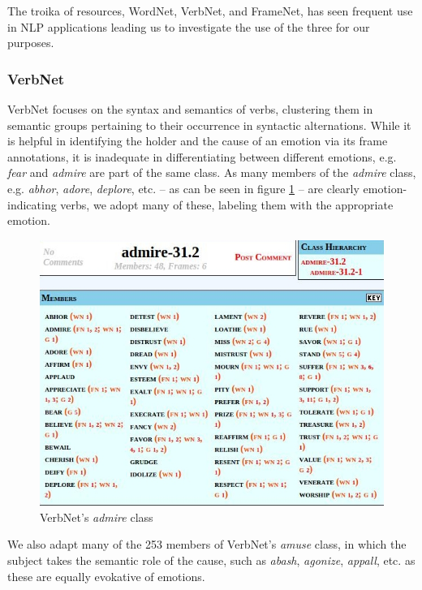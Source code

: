The troika of resources, WordNet, VerbNet, and FrameNet, has seen frequent use in NLP applications leading us to investigate the use of the three for our purposes.

\subsubsection{VerbNet}

VerbNet \cite{verbnet} focuses on the syntax and semantics of verbs, clustering them in semantic groups pertaining to their occurrence in syntactic alternations. While it is helpful in identifying the holder and the cause of an emotion via its frame annotations, it is inadequate in differentiating between different emotions, e.g. \textit{fear} and \textit{admire} are part of the same class. As many members of the \textit{admire} class, e.g. \textit{abhor}, \textit{adore}, \textit{deplore}, etc. -- as can be seen in figure \ref{fig:admire_class} --  are clearly emotion-indicating verbs, we adopt many of these, labeling them with the appropriate emotion.

\begin{figure}[bth]
\includegraphics[width=\linewidth]{gfx/admire_class.jpg}
\caption{VerbNet's \textit{admire} class}\label{fig:admire_class}
\end{figure}

We also adapt many of the 253 members of VerbNet's \textit{amuse} class, in which the subject takes the semantic role of the cause, such as \textit{abash}, \textit{agonize}, \textit{appall}, etc. as these are equally evokative of emotions.

